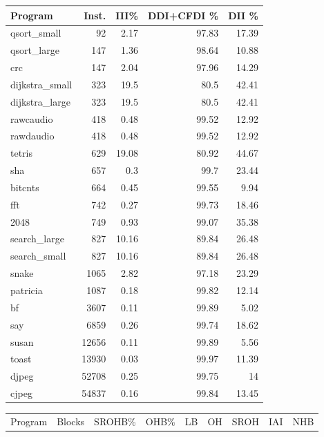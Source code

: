 \begin{tabular}{lrrrr}
\hline
 Program        &   Inst. &   III\% &   DDI+CFDI \% &   DII \% \\
\hline
 qsort\_small    &      92 &   2.17 &        97.83 &   17.39 \\
 qsort\_large    &     147 &   1.36 &        98.64 &   10.88 \\
 crc            &     147 &   2.04 &        97.96 &   14.29 \\
 dijkstra\_small &     323 &  19.5  &        80.5  &   42.41 \\
 dijkstra\_large &     323 &  19.5  &        80.5  &   42.41 \\
 rawcaudio      &     418 &   0.48 &        99.52 &   12.92 \\
 rawdaudio      &     418 &   0.48 &        99.52 &   12.92 \\
 tetris         &     629 &  19.08 &        80.92 &   44.67 \\
 sha            &     657 &   0.3  &        99.7  &   23.44 \\
 bitcnts        &     664 &   0.45 &        99.55 &    9.94 \\
 fft            &     742 &   0.27 &        99.73 &   18.46 \\
 2048           &     749 &   0.93 &        99.07 &   35.38 \\
 search\_large   &     827 &  10.16 &        89.84 &   26.48 \\
 search\_small   &     827 &  10.16 &        89.84 &   26.48 \\
 snake          &    1065 &   2.82 &        97.18 &   23.29 \\
 patricia       &    1087 &   0.18 &        99.82 &   12.14 \\
 bf             &    3607 &   0.11 &        99.89 &    5.02 \\
 say            &    6859 &   0.26 &        99.74 &   18.62 \\
 susan          &   12656 &   0.11 &        99.89 &    5.56 \\
 toast          &   13930 &   0.03 &        99.97 &   11.39 \\
 djpeg          &   52708 &   0.25 &        99.75 &   14    \\
 cjpeg          &   54837 &   0.16 &        99.84 &   13.45 \\
\hline
\end{tabular}\begin{tabular}{lrrrrrrrr}
\hline
 Program        &   Blocks &   SROHB\% &   OHB\% &   LB &   OH &   SROH &   IAI &   NHB \\

\end{tabular}
